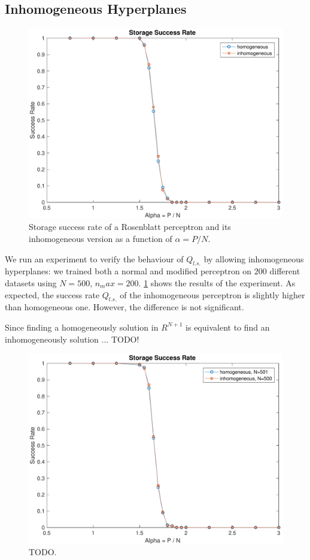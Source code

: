 \subsection{Inhomogeneous Hyperplanes}
\label{subsec:homogeneous}
\begin{figure}[t]
	\centering
	\includegraphics[width=\columnwidth]{figures/homogeneous}
    \caption{Storage success rate of a Rosenblatt perceptron and its inhomogeneous version as a function of $\alpha = P / N$.}
	\label{fig:homogeneous}
\end{figure}

We run an experiment to verify the behaviour of $Q_{l.s.}$ by allowing inhomogeneous hyperplanes:
we trained both a normal and modified perceptron on $200$ different datasets using $N = 500$, $n_max = 200$. 
\cref{fig:homogeneous} shows the results of the experiment.
As expected, the success rate $Q_{l.s.}$ of the inhomogeneous perceptron is slightly higher than homogeneous one.
However, the difference is not significant.

Since finding a homogeneously solution in $R^{N+1}$ is equivalent to find an inhomogeneously solution ... TODO!

\begin{figure}[t]
	\centering
	\includegraphics[width=\columnwidth]{figures/homogeneous_n_n1}
    \caption{TODO.}
	\label{fig:homogeneous_n_n1}
\end{figure}

